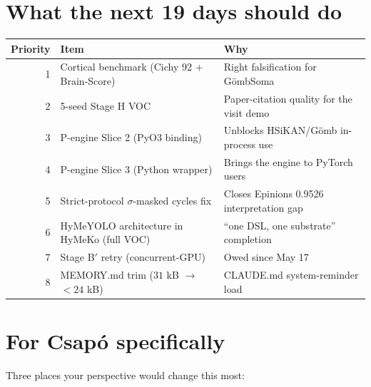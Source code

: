\documentclass[11pt,a4paper]{article}
\theoremstyle{plain}
\theoremstyle{definition}
\begin{document}
\section{What the next 19 days should do}

\begin{center}\footnotesize
\begin{tabular}{rll}
\toprule
Priority & Item & Why \\
\midrule
1 & Cortical benchmark (Cichy 92 + Brain-Score) & Right falsification for GömbSoma \\
2 & 5-seed Stage H VOC                          & Paper-citation quality for the visit demo \\
3 & P-engine Slice 2 (PyO3 binding)              & Unblocks HSiKAN/Gömb in-process use \\
4 & P-engine Slice 3 (Python wrapper)            & Brings the engine to PyTorch users \\
5 & Strict-protocol $\sigma$-masked cycles fix   & Closes Epinions 0.9526 interpretation gap \\
6 & HyMeYOLO architecture in HyMeKo (full VOC)   & ``one DSL, one substrate'' completion \\
7 & Stage B$'$ retry (concurrent-GPU)            & Owed since May 17 \\
8 & MEMORY.md trim ($31$ kB $\to$ $<24$ kB)      & CLAUDE.md system-reminder load \\
\bottomrule
\end{tabular}
\end{center}

\section*{For Csap\'o specifically}

Three places your perspective would change this most:
\end{document}
